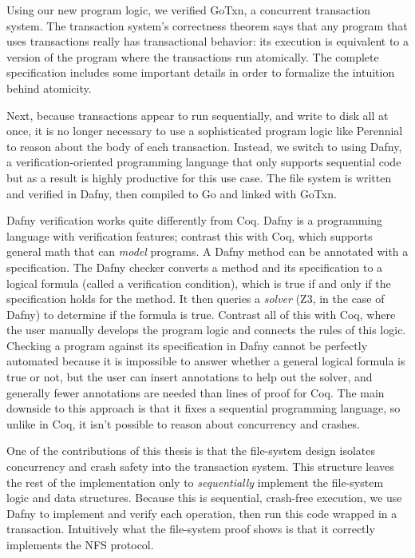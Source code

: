 Using our new program logic, we verified GoTxn, a concurrent transaction system.
The transaction system's correctness theorem says that any program that uses
transactions really has transactional behavior: its execution is equivalent to a
version of the program where the transactions run atomically. The complete
specification includes some important details in order to formalize the
intuition behind atomicity.

Next, because transactions appear to run sequentially, and write to disk all at
once, it is no longer necessary to use a sophisticated program logic like
Perennial to reason about the body of each transaction. Instead, we switch to
using Dafny, a verification-oriented programming language that only supports
sequential code but as a result is highly productive for this use case. The file
system is written and verified in Dafny, then compiled to Go and linked with
GoTxn.

Dafny verification works quite differently from Coq. Dafny is a programming
language with verification features; contrast this with Coq, which supports
general math that can \emph{model} programs. A Dafny method can be annotated
with a specification. The Dafny checker converts a method and its specification
to a logical formula (called a verification condition), which is true if and only if the specification holds for
the method. It then queries a \emph{solver} (Z3, in the case of Dafny) to determine if the formula is true.
Contrast all of this with Coq, where the user manually develops the program
logic and connects the rules of this logic. Checking a program against its specification in Dafny cannot be perfectly
automated because it is impossible to answer whether a general logical formula
is true or not, but the user can insert annotations to help out the solver, and
generally fewer annotations are needed than lines of proof for Coq. The main
downside to this approach is that it fixes a sequential programming language, so
unlike in Coq, it isn't possible to reason about concurrency and crashes.

One of the contributions of this thesis is that the file-system design isolates
concurrency and crash safety into the transaction system. This structure leaves
the rest of the implementation only to \emph{sequentially} implement the
file-system logic and data structures. Because this is sequential, crash-free
execution, we use Dafny to implement and verify each operation, then run this
code wrapped in a transaction. Intuitively what the file-system proof shows is
that it correctly implements the NFS protocol.

